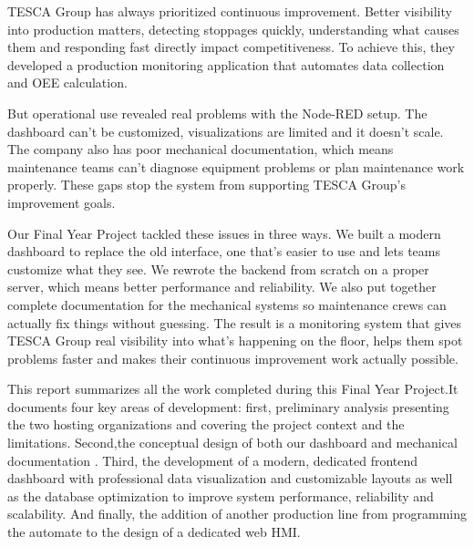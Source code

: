 \hspace*{0.25cm}TESCA Group has always prioritized continuous 
improvement. Better visibility into production
matters, detecting stoppages quickly, 
understanding what causes them and responding 
fast directly impact competitiveness. To achieve 
this, they developed a production monitoring 
application that automates data collection 
and OEE calculation.

\par\vspace{0.3cm}


\hspace*{0.25cm}But operational use revealed real problems
with the Node-RED setup. The dashboard can't 
be customized, visualizations are limited and 
it doesn't scale. 
The company also has poor mechanical 
documentation, which means maintenance teams 
can't diagnose equipment problems or plan 
maintenance work properly. These gaps stop 
the system from supporting TESCA Group's 
improvement goals.

\par\vspace{0.3cm}


\hspace*{0.25cm}Our Final Year Project tackled these issues 
in three ways. We built a modern dashboard 
to replace the old interface, one that's easier 
to use and lets teams customize what they see. 
We rewrote the backend from scratch on a proper 
server, which means better performance and 
reliability. We also put together complete 
documentation for the mechanical 
systems so maintenance crews can actually fix 
things without guessing. The result is a 
monitoring system that gives TESCA Group 
real visibility into what's happening on 
the floor, helps them spot problems faster
and makes their continuous improvement work 
actually possible.

\par\vspace{0.3cm}

\hspace*{0.25cm}This report summarizes all the work 
completed during this Final Year Project.It documents four key areas of 
development: first, preliminary analysis 
presenting the two hosting organizations 
and covering the project context and the 
limitations. Second,the conceptual design of both our dashboard 
and mechanical documentation . Third, the development 
of a modern, dedicated frontend dashboard 
with professional data visualization and 
customizable layouts as well as the database optimization to 
improve system performance, reliability 
and scalability. And finally, the addition of another production line from 
programming the automate to the design of a dedicated  web HMI.
